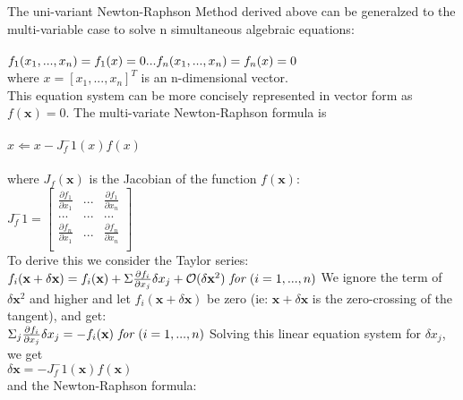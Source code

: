 \documentclass{article}
\begin{document}
\begin{enumerate}
\begin{enumerate}[label=\arabic*)]
					The uni-variant Newton-Raphson Method derived above can be generalzed to the multi-variable case to solve n simultaneous algebraic equations:\\ \\
					$
					f_1(x_1, ...,x_n)=f_1(x) = 0 \\
					...\\
					f_n(x_1, ...,x_n)=f_n(x) = 0 \\
					$
					\\ where $x = [x_1,...,x_n]^T$ is an n-dimensional vector.\\
					This equation system can be more concisely represented in vector 							form as $f(\textbf{x})=0$. The multi-variate Newton-Raphson formula 						is \\ \\ $x \Leftarrow x - J_f^-1(x)f(x)$ \\ \\ where 										$J_f(\textbf{x})$ is the Jacobian of the function $f(\textbf{x})$:\\ 					$J_f^-1 = \left[ \begin{array}{ccc}
					\frac{\partial f_1}{\partial x_1}	& ...	&\frac{\partial f_1}{\partial x_n}\\
					...									& ...	& ...\\
					\frac{\partial f_n}{\partial x_1}	& ...	&\frac{\partial f_n}{\partial x_n}\\
					\end{array} \right] $ \\
					To derive this we consider the Taylor series: \\
					$
					f_i(\textbf{x} + \delta \textbf{x}) = f_i(\textbf{x}) + \Sigma								\frac{\partial f_i}{\partial x_j}\delta x_j + \mathcal{O}(\delta							\textbf{x}^2) \textit{ for }  (i=1,...,n) \\
					$
					We ignore the term of $\delta \textbf{x}^2$ and higher and let 								$f_i(\textbf{x} +\delta \textbf{x})$ be zero (ie: $\textbf{x} + 							\delta \textbf{x}$ is the zero-crossing of the tangent), and get: \\
					$
					\Sigma_j \frac{\partial f_i}{\partial x_j} \delta x_j = -									f_i(\textbf{x})\textit{ for } (i=1, ...,n) \\
					$
					Solving this linear equation system for $\delta x_j$, we get\\
					$\delta \textbf{x} = -J_f^-1(\textbf{x})f(\textbf{x}) $ \\
					and the Newton-Raphson formula: \\

\end{enumerate}
\end{enumerate}
\end{document}
